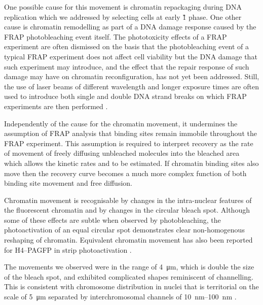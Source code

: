     One possible cause for this movement is chromatin repackaging
    during DNA replication which we addressed by selecting cells at
    early \G1{} phase.
    One other cause is chromatin remodelling as part of a DNA damage
    response caused by the FRAP photobleaching event itself.
    The phototoxicity effects of a FRAP experiment are often dismissed
    on the basis that the photobleaching event of a typical FRAP
    experiment does not affect cell viability
    \citep{kruhlak2000reduced, KimuraCook, carrero2003using} but the
    DNA damage that such experiment may introduce, and the effect that
    the repair response of such damage may have on chromatin
    reconfiguration, has not yet been addressed.
    Still, the use of laser beams of different wavelength and longer
    exposure times are often used to introduce both single and double
    DNA strand breaks on which FRAP experiments are then performed
    \citep{stixova2014advanced, mari2006dynamic, kim2002specific}.

    Independently of the cause for the chromatin movement,
    it undermines the assumption of FRAP analysis that binding sites
    remain immobile throughout the FRAP experiment.
    This assumption is required to interpret recovery
    as the rate of movement of freely diffusing unbleached molecules into the
    bleached area which allows the kinetic
    rates \kon{} and \koff{} to be estimated.
    If chromatin binding sites also move then the recovery curve becomes a
    much more complex function of both binding site movement and free diffusion.

    Chromatin movement is recognisable
    by changes in the intra-nuclear features of the fluorescent chromatin
    and by changes in the circular bleach spot.
    Although some of these effects are subtle when observed by photobleaching,
    the photoactivation of an equal circular spot demonstrates
    clear non-homogenous reshaping of chromatin.
    Equivalent chromatin movement has also been reported
    for H4--PAGFP in strip photoactivation \cite{H4PAGFP-chromatin-movement}.

    The movements we observed were in the
    range of \SI{4}{\um}, which is double the size of the bleach spot,
    and exhibited complicated shapes reminiscent of channelling.
    This is consistent with chromosome distribution in nuclei that is
    territorial on the scale of \SI{5}{\um} \citep{sun2000size}
    separated by interchromosomal channels of
    \SIrange{10}{100}{\nm} \citep{gorisch2005histone}.

